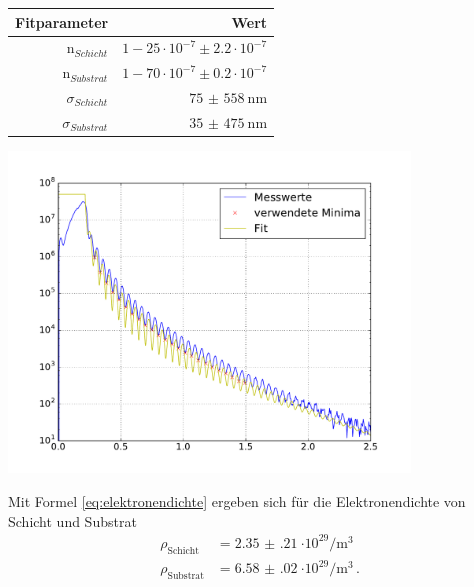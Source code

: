\documentclass[captions=tableheading]{scrartcl}
\begin{document}
\begin{table}[H]
	\centering
	\label{tab:fitparameter}
	\begin{tabular}{r r}
		\toprule
		Fitparameter & Wert \\
		\midrule
		n$_{Schicht}$ & $1 - 25\cdot10^{-7} \pm 2.2\cdot10^{-7}$ \\
		n$_{Substrat}$ & $1 - 70\cdot10^{-7}\pm 0.2\cdot10^{-7}$ \\
		$\sigma_{Schicht}$ &  $\SI{75(558)}{\nano\metre}$ \\
		$\sigma_{Substrat}$ & $\SI{35(475)}{\nano\metre}$ \\
		\bottomrule
	\end{tabular}
\end{table}

\begin{center}
	\includegraphics[width=0.8\textwidth]{images/reflectrometry.pdf}
	\label{fig:reflektivitaet}
\end{center}

Mit Formel \ref{eq:elektronendichte} ergeben sich für die Elektronendichte von Schicht und Substrat
\begin{align*}
\rho_{\text{Schicht}}&=\SI{2.35(21)}{\cdot10^{29}\per\metre\cubed} \\
\rho_{\text{Substrat}}&=\SI{6.58(02)}{\cdot10^{29}\per\metre\cubed}\,.
\end{align*}
\end{document}
